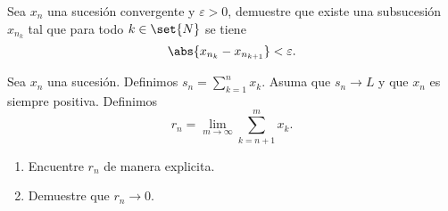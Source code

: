 \documentclass{ayudantia}
\begin{document}
\begin{ans}
    \begin{sol}

    \end{sol}
\end{ans}



\begin{prob}
    Sea \(x_n\) una sucesión convergente y \(\varepsilon>0\), demuestre que existe una subsucesión \(x_{n_k}\) tal que para todo \(k\in\set{N}\) se tiene
    \begin{equation*}
        \abs{x_{n_k}-x_{n_{k+1}}}<\varepsilon.
    \end{equation*}    
\end{prob}    

\begin{ans}
    \begin{sol}

    \end{sol}    
\end{ans}    

\begin{prob}
    Sea \(x_n\) una sucesión. Definimos \(s_n=\sum_{k=1}^nx_k\). Asuma que \(s_n\rightarrow L\) y que \(x_n\) es siempre positiva. Definimos
    \begin{equation*}
        r_n=\lim_{m\rightarrow\infty}\sum_{k=n+1}^mx_k.
    \end{equation*}
    \begin{enumerate}[label=(\alph*)]
        \item Encuentre \(r_n\) de manera explicita.
        \item Demuestre que \(r_n\rightarrow 0\).
    \end{enumerate}
\end{prob}

\begin{ans}
    \begin{sol}

    \end{sol}
\end{ans}
\end{document}
